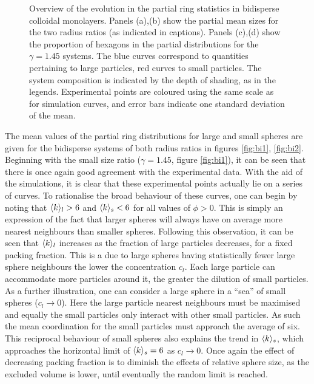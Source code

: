 \begin{figure}[bt]
     \caption{Overview of the evolution in the partial ring statistics in bidisperse colloidal monolayers. Panels (a),(b) show the partial mean sizes for the two radius ratios (as indicated in captions). Panels (c),(d) show the proportion of hexagons in the partial distributions for the $\gamma=1.45$ systems. The blue curves correspond to quantities pertaining to large particles, red curves to small particles. The system composition is indicated by the depth of shading, as in the legends. Experimental points are coloured using the same scale as for simulation curves, and error bars indicate one standard deviation of the mean.}
     \label{fig:bi}
\end{figure}

The mean values of the partial ring distributions for large and small spheres are given for the bidisperse systems of both radius ratios in figures \ref{fig:bi1}, \ref{fig:bi2}.
Beginning with the small size ratio ($\gamma=1.45$, figure \ref{fig:bi1}), it can be seen that there is once again good agreement with the experimental data.
With the aid of the \mc{} simulations, it is clear that these experimental points actually lie on a series of curves.
To rationalise the broad behaviour of these curves, one can begin by noting that $\langle k \rangle_l>6$ and $\langle k \rangle_s<6$ for all values of $\phi>0$.
This is simply an expression of the fact that larger spheres will always have on average more nearest neighbours than smaller spheres.
Following this observation, it can be seen that $\langle k \rangle_l$ increases as the fraction of large particles decreases, for a fixed packing fraction.
This is a due to large spheres having statistically fewer large sphere neighbours the lower the concentration $c_l$.
Each large particle can accommodate more particles around it, the greater the dilution of small particles.
As a further illustration, one can consider a large sphere in a ``sea'' of small spheres ($c_l\rightarrow 0$).
Here the large particle nearest neighbours must be maximised and equally the small particles only interact with other small particles.
As such the mean coordination for the small particles must approach the average of six.
This reciprocal behaviour of small spheres also explains the trend in $\langle k \rangle_s$, which approaches the horizontal limit of $\langle k \rangle_s=6$ as $c_l\rightarrow 0$.
Once again the effect of decreasing packing fraction is to diminish the effects of relative sphere size, as the excluded volume is lower, until eventually the random limit is reached.

